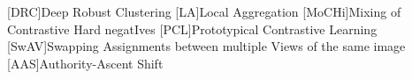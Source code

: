 \begin{acronym}

    [DRC]{Deep Robust Clustering}
    [LA]{Local Aggregation}
    [MoCHi]{Mixing of Contrastive Hard negatIves}
    [PCL]{Prototypical Contrastive Learning}
    [SwAV]{Swapping Assignments between multiple Views of the same image}
    [AAS]{Authority-Ascent Shift}

\end{acronym}